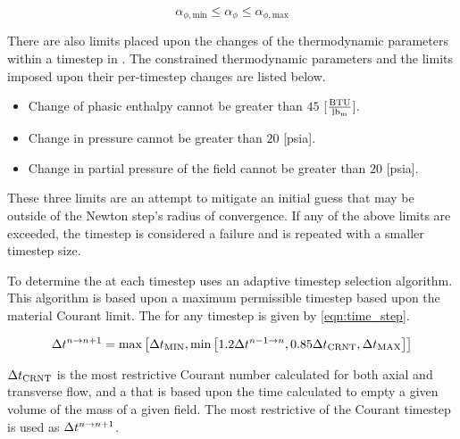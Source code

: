 \begin{equation}
\label{eqn:volume_fraction}
\alpha_{\phi,\text{min}} \leq \alpha_{\phi} \leq \alpha_{\phi,\text{max}} 
\end{equation}

There are also limits placed upon the changes of the thermodynamic parameters within a timestep in \cobra{}.
The constrained thermodynamic parameters and the limits imposed upon their per-timestep changes are listed below.

\begin{itemize}
\item{Change of phasic enthalpy cannot be greater than $45$ [$\frac{\text{BTU}}{\lbm{}}$].}
\item{Change in pressure cannot be greater than $20$ [psia].}
\item{Change in partial pressure of the \ncg{} field cannot be greater than $20$ [psia].}
\end{itemize}

These three limits are an attempt to mitigate an initial guess that may be outside of the Newton step's radius of convergence.
If any of the above limits are exceeded, the timestep is considered a failure and is repeated with a smaller timestep size.

To determine the \dt{} at each timestep \cobra{} uses an adaptive timestep selection algorithm.
This algorithm is based upon a maximum permissible timestep based upon the material Courant limit.
The \dt{} for any timestep is given by \eqref{eqn:time_step}.

\begin{equation}
\label{eqn:time_step}
\dt{}^{n \rightarrow n+1} = \max\left[ \dt{}_{\text{MIN}}, \min\left[1.2 \dt{}^{n-1 \rightarrow n}, 0.85 \dt{}_{\text{CRNT}}, \dt{}_{\text{MAX}} \right]\right]
\end{equation}

$\dt{}_{\text{CRNT}}$ is the most restrictive Courant number calculated for both axial and transverse flow, and a \dt{} that is based upon the time calculated to empty a given volume of the mass of a given field.
The most restrictive of the Courant timestep is used as $\dt{}^{n \rightarrow n+1}$.